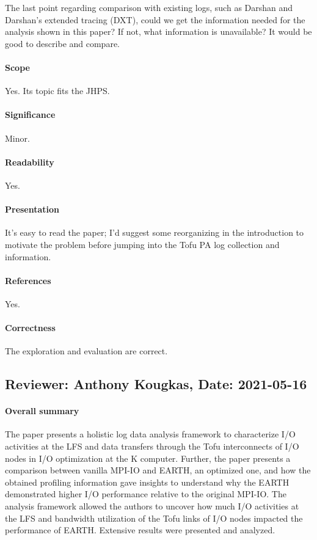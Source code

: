 \documentclass{jhps}
\begin{document}
The last point regarding comparison with existing logs, such as Darshan and Darshan’s extended tracing (DXT), could we get the information needed for the analysis shown in this paper? If not, what information is unavailable? It would be good to describe and compare. 

\paragraph{Scope}   %
Yes. Its topic fits the JHPS.

\paragraph{Significance}   %
Minor.

\paragraph{Readability}   %
Yes.

\paragraph{Presentation}
It's easy to read the paper; I’d suggest some reorganizing in the introduction to motivate the problem before jumping into the Tofu PA log collection and information. 
\paragraph{References}   %
Yes.

\paragraph{Correctness}   %
The exploration and evaluation are correct.


\subsection*{Reviewer: Anthony Kougkas, Date: 2021-05-16}

\paragraph{Overall summary}
The paper presents a holistic log data analysis framework to characterize I/O activities at the
LFS and data transfers through the Tofu interconnects of I/O nodes in I/O optimization at
the K computer. Further, the paper presents a comparison between vanilla MPI-IO and EARTH, an optimized one, and how the obtained profiling information gave insights to understand why the EARTH demonstrated higher I/O performance relative to the original MPI-IO. The analysis framework allowed the authors to uncover how much I/O activities at the LFS and bandwidth utilization of the Tofu links of I/O nodes impacted the performance of EARTH. Extensive results were presented and analyzed. 
\end{document}
